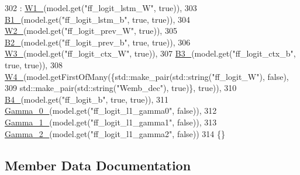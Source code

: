 \begin{DoxyCode}
302     : \hyperlink{structamunmt_1_1GPU_1_1Weights_1_1DecSoftmax_abb369b3ad25c44af574478b232eb6c9b}{W1\_}(model.get(\textcolor{stringliteral}{"ff\_logit\_lstm\_W"}, \textcolor{keyword}{true})),
303       \hyperlink{structamunmt_1_1GPU_1_1Weights_1_1DecSoftmax_a89de082b62b2f4b8e4a3218100191c81}{B1\_}(model.get(\textcolor{stringliteral}{"ff\_logit\_lstm\_b"}, \textcolor{keyword}{true}, \textcolor{keyword}{true})),
304       \hyperlink{structamunmt_1_1GPU_1_1Weights_1_1DecSoftmax_a0ed119030e1d4a42e1cbabc8a5606d18}{W2\_}(model.get(\textcolor{stringliteral}{"ff\_logit\_prev\_W"}, \textcolor{keyword}{true})),
305       \hyperlink{structamunmt_1_1GPU_1_1Weights_1_1DecSoftmax_af1abfc82b60f11afeb544bff95e0dc21}{B2\_}(model.get(\textcolor{stringliteral}{"ff\_logit\_prev\_b"}, \textcolor{keyword}{true}, \textcolor{keyword}{true})),
306       \hyperlink{structamunmt_1_1GPU_1_1Weights_1_1DecSoftmax_a26f826f4efcff85ca10f3ba3414f4020}{W3\_}(model.get(\textcolor{stringliteral}{"ff\_logit\_ctx\_W"}, \textcolor{keyword}{true})),
307       \hyperlink{structamunmt_1_1GPU_1_1Weights_1_1DecSoftmax_a32f075c1adcc86d06031ea5a9239ca6c}{B3\_}(model.get(\textcolor{stringliteral}{"ff\_logit\_ctx\_b"}, \textcolor{keyword}{true}, \textcolor{keyword}{true})),
308       \hyperlink{structamunmt_1_1GPU_1_1Weights_1_1DecSoftmax_ab63526171f9ce507a531e9981aca46d4}{W4\_}(model.getFirstOfMany(\{std::make\_pair(std::string(\textcolor{stringliteral}{"ff\_logit\_W"}), false),
309                                 std::make\_pair(std::string(\textcolor{stringliteral}{"Wemb\_dec"}), true)\}, \textcolor{keyword}{true})),
310       \hyperlink{structamunmt_1_1GPU_1_1Weights_1_1DecSoftmax_af977c664f447f9be7e9e5012f150512a}{B4\_}(model.get(\textcolor{stringliteral}{"ff\_logit\_b"}, \textcolor{keyword}{true}, \textcolor{keyword}{true})),
311       \hyperlink{structamunmt_1_1GPU_1_1Weights_1_1DecSoftmax_a63a49f9647e63f4025784073d7208119}{Gamma\_0\_}(model.get(\textcolor{stringliteral}{"ff\_logit\_l1\_gamma0"}, \textcolor{keyword}{false})),
312       \hyperlink{structamunmt_1_1GPU_1_1Weights_1_1DecSoftmax_aee6cd0c228c5a28670af55ece5a034f5}{Gamma\_1\_}(model.get(\textcolor{stringliteral}{"ff\_logit\_l1\_gamma1"}, \textcolor{keyword}{false})),
313       \hyperlink{structamunmt_1_1GPU_1_1Weights_1_1DecSoftmax_ad876cf5cc5dd9974c29839baaf1af18f}{Gamma\_2\_}(model.get(\textcolor{stringliteral}{"ff\_logit\_l1\_gamma2"}, \textcolor{keyword}{false}))
314     \{\}
\end{DoxyCode}


\subsection{Member Data Documentation}
